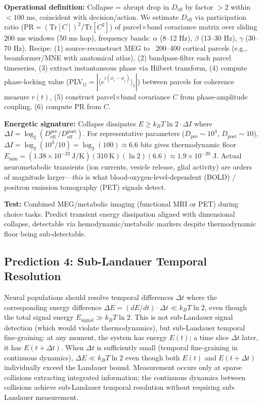 \documentclass[12pt]{article}
\begin{document}
\textbf{Operational definition:} Collapse = abrupt drop in $D_{\text{eff}}$ by factor $>2$ within $<100$ ms, coincident with decision/action. We estimate $D_{\text{eff}}$ via participation ratio ($\text{PR} = (\text{Tr}[C])^2/\text{Tr}[C^2]$) of parcel$\times$band covariance matrix over sliding 200 ms windows (50 ms hop), frequency bands: $\alpha$ (8--12 Hz), $\beta$ (13--30 Hz), $\gamma$ (30--70 Hz). Recipe: (1) source-reconstruct MEG to ~200--400 cortical parcels (e.g., beamformer/MNE with anatomical atlas), (2) bandpass-filter each parcel timeseries, (3) extract instantaneous phase via Hilbert transform, (4) compute phase-locking value (PLV$_{ij} = |\langle e^{i(\phi_i - \phi_j)} \rangle_t|$) between parcels for coherence measure $r(t)$, (5) construct parcel$\times$band covariance $C$ from phase-amplitude coupling, (6) compute PR from $C$.

\textbf{Energetic signature:} Collapse dissipates $E \geq k_B T \ln 2 \cdot \Delta I$ where $\Delta I = \log_2(D_{\text{eff}}^{\text{pre}}/D_{\text{eff}}^{\text{post}})$. For representative parameters ($D_{\text{pre}} \sim 10^3$, $D_{\text{post}} \sim 10$), $\Delta I = \log_2(10^3/10) = \log_2(100) \approx 6.6$ bits gives thermodynamic floor $E_{\min} = (1.38 \times 10^{-23}~\text{J/K})(310~\text{K})(\ln 2)(6.6) \approx 1.9 \times 10^{-20}$ J. Actual neurometabolic transients (ion currents, vesicle release, glial activity) are orders of magnitude larger---\textit{this} is what blood-oxygen-level-dependent (BOLD) / positron emission tomography (PET) signals detect.

\textbf{Test:} Combined MEG/metabolic imaging (functional MRI or PET) during choice tasks. Predict transient energy dissipation aligned with dimensional collapse, detectable via hemodynamic/metabolic markers despite thermodynamic floor being sub-detectable.

\subsection{Prediction 4: Sub-Landauer Temporal Resolution}

Neural populations should resolve temporal differences $\Delta t$ where the corresponding energy difference $\Delta E = (dE/dt) \cdot \Delta t \ll k_B T \ln 2$, even though the total signal energy $E_{\text{signal}} \gg k_B T \ln 2$. This is not sub-Landauer signal detection (which would violate thermodynamics), but sub-Landauer temporal fine-graining: at any moment, the system has energy $E(t)$; a time slice $\Delta t$ later, it has $E(t + \Delta t)$. When $\Delta t$ is sufficiently small (temporal fine-graining in continuous dynamics), $\Delta E \ll k_B T \ln 2$ even though both $E(t)$ and $E(t + \Delta t)$ individually exceed the Landauer bound. Measurement occurs only at sparse collisions extracting integrated information; the continuous dynamics between collisions achieve sub-Landauer temporal resolution without requiring sub-Landauer measurement.
\end{document}
